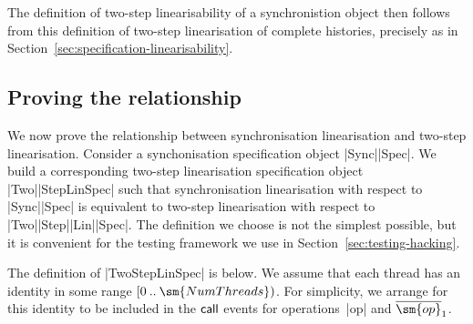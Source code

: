 The definition of two-step linearisability of a synchronistion object then
follows from this definition of two-step linearisation of complete histories,
precisely as in Section~\ref{sec:specification-linearisability}.



\subsection{Proving the relationship}
\label{sec:twoStepLinSpec}

We now prove the relationship between synchronisation linearisation and
two-step linearisation.
%
Consider a synchonisation specification object |Sync|\-|Spec|.  We build a
corresponding two-step linearisation specification object |Two|\-|StepLinSpec|
such that synchronisation linearisation with respect to |Sync|\-|Spec| is
equivalent to two-step linearisation with respect to
|Two|\-|Step|\-|Lin|\-|Spec|.  The definition we choose is not the simplest
possible, but it is convenient for the testing framework we use in
Section~\ref{sec:testing-hacking}.

The definition of |TwoStepLinSpec| is below.  We assume that each thread has
an identity in some range $\range 0 {\sm{NumThreads}}$.  For simplicity, we
arrange for this identity to be included in the $\mathsf{call}$ events for
operations~|op| and $\overline{\sm{op}}_1$.

